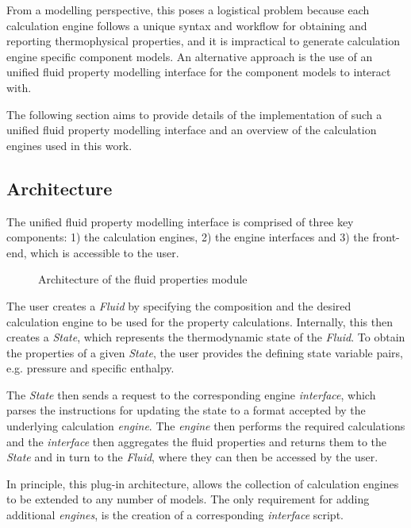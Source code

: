     From a modelling perspective, this poses a logistical problem because each calculation engine follows a unique syntax and workflow for obtaining and reporting thermophysical properties, and it is impractical to generate calculation engine specific component models. An alternative approach is the use of an unified fluid property modelling interface for the component models to interact with.

    The following section aims to provide details of the implementation of such a unified fluid property modelling interface and an overview of the calculation engines used in this work.

    \subsection{Architecture}
        The unified fluid property modelling interface is comprised of three key components: 1) the calculation engines, 2) the engine interfaces and 3) the front-end, which is accessible to the user.

        \begin{figure}[H]
            \centering
            
            \caption{Architecture of the fluid properties module}
            \label{fig:powercycle_fluidprops}
        \end{figure}

        The user creates a \emph{Fluid} by specifying the composition and the desired calculation engine to be used for the property calculations. Internally, this then creates a \emph{State}, which represents the thermodynamic state of the \emph{Fluid}. To obtain the properties of a given \emph{State}, the user provides the defining state variable pairs, e.g. pressure and specific enthalpy.

        The \emph{State} then sends a request to the corresponding engine \emph{interface}, which parses the instructions for updating the state to a format accepted by the underlying calculation \emph{engine}. The \emph{engine} then performs the required calculations and the \emph{interface} then aggregates the fluid properties and returns them to the \emph{State} and in turn to the \emph{Fluid}, where they can then be accessed by the user.

        In principle, this plug-in architecture, allows the collection of calculation engines to be extended to any number of models. The only requirement for adding additional \emph{engines}, is the creation of a corresponding \emph{interface} script.
        
